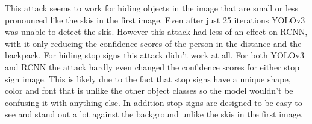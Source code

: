 \documentclass{article}
\begin{document}
This attack seems to work for hiding objects in the image that are small or less pronounced like the skis in the first image. Even after just 25 iterations YOLOv3 was unable to detect the skis. However this attack had less of an effect on RCNN, with it only reducing the confidence scores of the person in the distance and the backpack. For hiding stop signs this attack didn't work at all. For both YOLOv3 and RCNN the attack hardly even changed the confidence scores for either stop sign image. This is likely due to the fact that stop signs have a unique shape, color and font that is unlike the other object classes so the model wouldn't be confusing it with anything else. In addition stop signs are designed to be easy to see and stand out a lot against the background unlike the skis in the first image.

\clearpage


\end{document}
